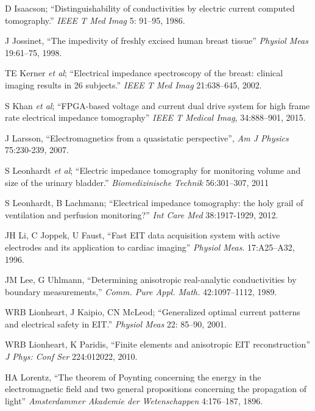 \documentclass[12pt]{article} \usepackage[margin=3cm]{geometry} \usepackage[margin=20pt,font=small,labelfont=bf]{caption}\def\TBLWIDA{35mm}\def\TBLWIDB{95mm}
\newcommand{\ifmaxthree}[2]{#2 {\em et al}; }
\begin{document}
\begin{thebibliography}{00}
D Isaacson;
``Distinguishability of conductivities by electric current computed tomography.''
{\em IEEE T Med Imag} 5: 91--95, 1986.

J Jossinet,
``The impedivity of freshly excised human breast tissue''
{\em Physiol Meas} 19:61--75, 1998.

\ifmaxthree{
TE Kerner, KD Paulsen, A Hartov, SK Soho, SP Poplack,
}{
TE Kerner
}
``Electrical impedance spectroscopy of the breast: clinical imaging results in 26 subjects.''
{\em  IEEE T Med Imag} 21:638--645, 2002.

\ifmaxthree{
S Khan, P Manwaring, A Borsic, R Halter, 
}{
S Khan
}
``FPGA-based voltage and current dual drive system for high frame rate electrical impedance tomography''
{\em IEEE T Medical Imag}, 34:888--901, 2015.

J Larsson,
``Electromagnetics from a quasistatic perspective'',
{\em Am J Physics} 75:230-239, 2007.

\ifmaxthree{
S Leonhardt, A Cordes, H Plewa, R Pikkemaat, I Soljanik, K Moehring, HJ Gerner, R Rupp,
}{
S Leonhardt
}
``Electric impedance tomography for monitoring volume and size of the urinary bladder.''
{\em Biomedizinische Technik} 56:301--307, 2011

S Leonhardt, B Lachmann;
``Electrical impedance tomography: the holy grail of
ventilation and perfusion monitoring?''
{\em Int Care Med} 38:1917-1929, 2012.

JH Li, C Joppek, U Faust,
``Fast EIT data acquisition system with active electrodes and its application to cardiac imaging''
{\em  Physiol Meas}. 17:A25--A32, 1996.

JM Lee, G Uhlmann, ``Determining anisotropic real-analytic
 conductivities by boundary measurements,''
{\em Comm. Pure Appl. Math.} 42:1097--1112, 1989.

WRB Lionheart, J Kaipio, CN McLeod;
``Generalized optimal current patterns and electrical safety in EIT.'' 
{\em Physiol Meas} 22: 85--90, 2001.

WRB Lionheart, K Paridis,
``Finite elements and anisotropic EIT reconstruction''
{\em  J Phys: Conf Ser} 224:012022, 2010.

HA Lorentz,
``The theorem of Poynting concerning the energy in the electromagnetic
field and two general propositions concerning the propagation of light''
{\em  Amsterdammer Akademie der Wetenschappen} 4:176--187, 1896.



\end{thebibliography}
\end{document}
